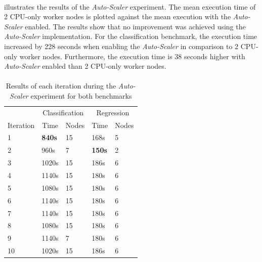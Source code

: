 \paragraph{}
 illustrates the results of the \textit{Auto-Scaler} experiment. The mean execution time of 2 CPU-only worker nodes is plotted against the mean execution with the \textit{Auto-Scaler} enabled.
The results show that no improvement was achieved using the \textit{Auto-Scaler} implementation.
For the classification benchmark, the execution time increased by 228 seconds when enabling the \textit{Auto-Scaler} in comparison to 2 CPU-only worker nodes. Furthermore, the execution time is 38 seconds higher with \textit{Auto-Scaler} enabled than 2 CPU-only worker nodes.

\paragraph{}
\begin{table}[ht]
\centering
\begin{tabular}{@{}l|ll|ll@{}}
\toprule
                               & \multicolumn{2}{c|}{Classification}                   & \multicolumn{2}{c}{Regression}                       \\
\multicolumn{1}{c|}{Iteration} & \multicolumn{1}{c}{Time} & \multicolumn{1}{c|}{Nodes} & \multicolumn{1}{c}{Time} & \multicolumn{1}{c}{Nodes} \\ \midrule
1  & \textbf{840s} & 15 & 168s          & 5 \\
2  & 960s          & 7  & \textbf{150s} & 2 \\
3  & 1020s         & 15 & 186s          & 6 \\
4  & 1140s         & 15 & 180s          & 6 \\
5  & 1080s         & 15 & 180s          & 6 \\
6  & 1140s         & 15 & 180s          & 6 \\
7  & 1140s         & 15 & 180s          & 6 \\
8  & 1080s         & 15 & 180s          & 6 \\
9  & 1140s         & 7  & 180s          & 6 \\
10 & 1020s         & 15 & 186s          & 6 \\ \bottomrule
\end{tabular}
\caption{Results of each iteration during the \textit{Auto-Scaler} experiment for both benchmarks}
\label{table:07_auto-scaler_iterations}
\end{table}
